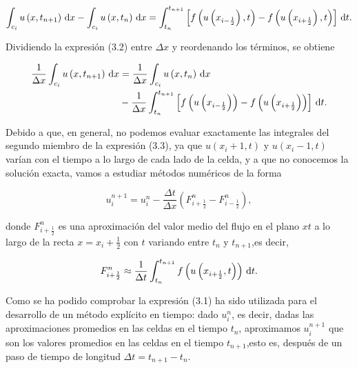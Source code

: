 \begin{equation*}
    \int_{c_{i}}
    u\left(x,t_{n+1}\right)\dl x-
    \int_{c_{i}}
    u\left(x,t_{n}\right)\dl x=
    \int_{t_{n}}^{t_{n+1}}
    \left[
        f\left(u\left(x_{i-\frac{1}{2}}\right),t\right)-
        f\left(u\left(x_{i+\frac{1}{2}}\right),t\right)
        \right]\dl t.
\end{equation*}

Dividiendo la expresión (3.2) entre $\Delta x$ y reordenando los
términos, se obtiene

\begin{gather*}
    \begin{split}
        \frac{1}{\Delta x}
        \int_{c_{i}}
        u\left(x,t_{n+1}\right)\dl x
         & =
        \frac{1}{\Delta x}
        \int_{c_{i}}
        u\left(x,t_{n}\right)\dl x \\
         & -
        \frac{1}{\Delta x}
        \int_{t_{n}}^{t_{n+1}}
        \left[
            f\left(u\left(x_{i-\frac{1}{2}}\right)\right)-
            f\left(u\left(x_{i+\frac{1}{2}}\right)\right)
            \right]\dl t.
    \end{split}
\end{gather*}

Debido a que, en general, no podemos evaluar exactamente las
integrales del segundo miembro de la expresión (3.3), ya que
$u\left(x_{i}+1,t\right)$ y $u\left(x_{i}-1,t\right)$ varían con el
tiempo a lo largo de cada lado de la celda, y a que no conocemos la
solución exacta, vamos a estudiar métodos numéricos de la forma

\begin{equation*}
    u^{n+1}_{i}=
    u^{n}_{i}-
    \frac{\Delta t}{\Delta x}
    \left(
    F^{n}_{i+\frac{1}{2}}-
    F^{n}_{i-\frac{1}{2}}
    \right),
\end{equation*}

donde $F^{n}_{i+\frac{1}{2}}$ es una aproximación del valor medio del
flujo en el plano $xt$ a lo largo de la recta $x=x_{i}+\frac{1}{2}$
con $t$ variando entre $t_{n}$ y $t_{n+1}$,es decir,

\begin{equation*}
    F^{n}_{i+\frac{1}{2}}\approx
    \frac{1}{\Delta t}
    \int_{t_{n}}^{t_{n+1}}
    f
    \left(
    u
    \left(x_{i+\frac{1}{2}},t\right)
    \right)
    \dl t.
\end{equation*}

Como se ha podido comprobar la expresión (3.1) ha sido utilizada para
el desarrollo de un método explícito en tiempo: dado $u^{n}_{i}$, es
decir, dadas las aproximaciones promedios en las celdas en el tiempo
$t_{n}$, aproximamos $u^{n+1}_{i}$ que son los valores promedios en
las celdas en el tiempo $t_{n+1}$,esto es, después de un paso de
tiempo de longitud $\Delta t=t_{n+1}-t_{n}$.

